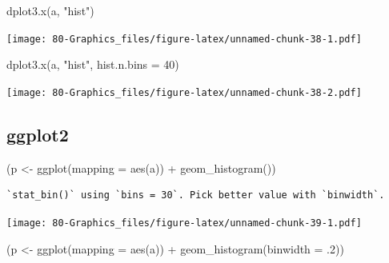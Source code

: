 \documentclass[
]{book}
\newenvironment{Shaded}{\begin{snugshade}}{\end{snugshade}}
\newcommand{\AttributeTok}[1]{\textcolor[rgb]{0.77,0.63,0.00}{#1}}
\newcommand{\DecValTok}[1]{\textcolor[rgb]{0.00,0.00,0.81}{#1}}
\newcommand{\FunctionTok}[1]{\textcolor[rgb]{0.00,0.00,0.00}{#1}}
\newcommand{\NormalTok}[1]{#1}
\newcommand{\OtherTok}[1]{\textcolor[rgb]{0.56,0.35,0.01}{#1}}
\newcommand{\SpecialCharTok}[1]{\textcolor[rgb]{0.00,0.00,0.00}{#1}}
\newcommand{\StringTok}[1]{\textcolor[rgb]{0.31,0.60,0.02}{#1}}
\begin{document}
\begin{Shaded}
\begin{Highlighting}[]
\FunctionTok{dplot3.x}\NormalTok{(a, }\StringTok{"hist"}\NormalTok{)}
\end{Highlighting}
\end{Shaded}

\texttt{[image: 80-Graphics\_files/figure-latex/unnamed-chunk-38-1.pdf]}

\begin{Shaded}
\begin{Highlighting}[]
\FunctionTok{dplot3.x}\NormalTok{(a, }\StringTok{"hist"}\NormalTok{, }\AttributeTok{hist.n.bins =} \DecValTok{40}\NormalTok{)}
\end{Highlighting}
\end{Shaded}

\texttt{[image: 80-Graphics\_files/figure-latex/unnamed-chunk-38-2.pdf]}

\hypertarget{ggplot2-4}{%
\subsection{\texorpdfstring{\textbf{ggplot2}}{ggplot2}}\label{ggplot2-4}}

\begin{Shaded}
\begin{Highlighting}[]
\NormalTok{(p }\OtherTok{\textless{}{-}} \FunctionTok{ggplot}\NormalTok{(}\AttributeTok{mapping =} \FunctionTok{aes}\NormalTok{(a)) }\SpecialCharTok{+} \FunctionTok{geom\_histogram}\NormalTok{())}
\end{Highlighting}
\end{Shaded}

\begin{verbatim}
`stat_bin()` using `bins = 30`. Pick better value with `binwidth`.
\end{verbatim}

\texttt{[image: 80-Graphics\_files/figure-latex/unnamed-chunk-39-1.pdf]}

\begin{Shaded}
\begin{Highlighting}[]
\NormalTok{(p }\OtherTok{\textless{}{-}} \FunctionTok{ggplot}\NormalTok{(}\AttributeTok{mapping =} \FunctionTok{aes}\NormalTok{(a)) }\SpecialCharTok{+} \FunctionTok{geom\_histogram}\NormalTok{(}\AttributeTok{binwidth =}\NormalTok{ .}\DecValTok{2}\NormalTok{))}
\end{Highlighting}
\end{Shaded}
\end{document}
